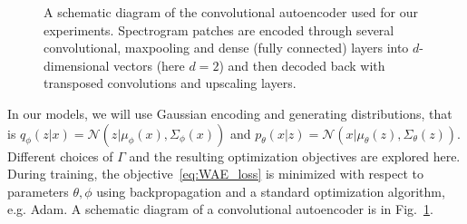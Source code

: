 \begin{figure}[htpb]
\begin{center}
\end{center}
\caption{A schematic diagram of the convolutional autoencoder used for our experiments. Spectrogram patches are encoded through several convolutional\cite{lecun1989backpropagation}, maxpooling\cite{ranzato2007efficient} and dense (fully connected) layers into $d$-dimensional vectors (here $d=2$) and then decoded back with transposed convolutions and upscaling layers.}
\label{fig:ae}
\end{figure}

In our models, we will use Gaussian encoding and generating distributions, that is $q_{\phi}(z|x )= \mathcal{N}\left( z | \mu_{\phi}(x), \Sigma_{\phi}(x) \right)$ and $p_{\theta}(x|z)= \mathcal{N}\left( x | \mu_{\theta}(z), \Sigma_{\theta}(z) \right)$. Different choices of $\Gamma$ and the resulting optimization objectives are explored here. During training, the objective~\eqref{eq:WAE_loss} is minimized with respect to parameters ${\theta, \phi}$ using backpropagation and a standard optimization algorithm, e.g. Adam\cite{kingma2014adam}. A schematic diagram of a convolutional autoencoder is in Fig.~\ref{fig:ae}.

